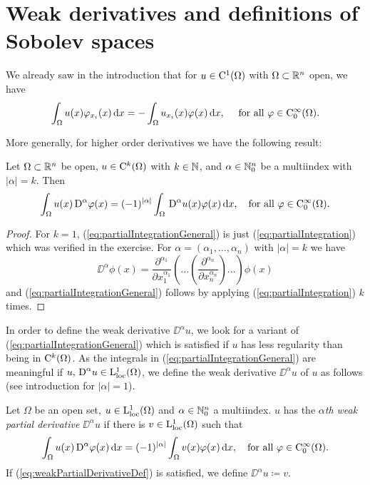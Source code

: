 \chapter{Weak derivatives and definitions of Sobolev spaces}

We already saw in the introduction that for $u \in \mathrm{C}^1(\Omega)$ with $\Omega \subset \mathbb{R}^n$ open, we have 
\begin{equation}
  \label{eq:partialIntegration}
  \int_\Omega u(x) \varphi_{x_i}(x) \, {\operatorname{d}\!{x}} = -\int_\Omega u_{x_i}(x) \varphi(x) \, {\operatorname{d}\!{x}}, \quad \text{ for all } \varphi \in \mathrm{C}_0^\infty(\Omega).
\end{equation}

More generally, for higher order derivatives we have the following result:
\begin{lem}
  \label{lem:partialIntegrationGeneral}
  Let $\Omega \subset \mathbb{R}^n$ be open, $u \in \mathrm{C}^k(\Omega)$ with $k \in \mathbb{N}$, and $\alpha \in \mathbb{N}_0^n$ be a multiindex with $|\alpha| = k$. Then
  \begin{equation}
    \label{eq:partialIntegrationGeneral}
    \int_\Omega u(x) \,{\operatorname{D}}^\alpha \varphi(x) = (-1)^{|\alpha|} \int_\Omega \,{\operatorname{D}}^\alpha u(x) \varphi(x) \, {\operatorname{d}\!{x}}, \quad\text{for all } \varphi \in \mathrm{C}_0^\infty(\Omega).
  \end{equation}
\end{lem}

\begin{proof}
  For $k = 1$, (\ref{eq:partialIntegrationGeneral}) is just (\ref{eq:partialIntegration}) which was verified in the exercise.
  For $\alpha = (\alpha_1,\dots,\alpha_n)$ with $|\alpha| = k$ we have
  $$
  \DD^\alpha \phi(x)= \frac{\partial^{\alpha_1}}{\partial x_1^{\alpha_1}} ( \dots ( \frac{\partial^{\alpha_n}}{\partial x_n^{\alpha_n}} ) \dots )\phi(x)
  $$
  and (\ref{eq:partialIntegrationGeneral}) follows by applying (\ref{eq:partialIntegration}) $k$ times.
\end{proof}

In order to define the weak derivative $\DD^\alpha u$, we look for a variant of (\ref{eq:partialIntegrationGeneral}) which is satisfied if $u$ has less regularity than being in $\mathrm{C}^k(\Omega)$.
As the integrals in (\ref{eq:partialIntegrationGeneral}) are meaningful if $u, \,{\operatorname{D}}^\alpha u \in \mathrm{L}^1_{\operatorname{loc}}(\Omega)$, we define the weak derivative $\DD^\alpha u$ of $u$ as follows (see introduction for $|\alpha| = 1$).

\begin{defn}
  \label{defn:weakPartialDerivative}
  Let $\Omega$ be an open set, $u \in \mathrm{L}^1_{\operatorname{loc}}(\Omega)$ and $\alpha \in \mathbb{N}_0^n$ a multiindex. 
  $u$ has the \emph{$\alpha$th weak partial derivative}  $\DD^\alpha u$ if there is $v \in \mathrm{L}_{\operatorname{loc}}^1(\Omega)$ such that
  \begin{equation}
    \label{eq:weakPartialDerivativeDef}
    \int_\Omega u(x) \,{\operatorname{D}}^\alpha \varphi(x) \, {\operatorname{d}\!{x}} = (-1)^{|\alpha|} \int_\Omega v(x) \varphi(x) \, {\operatorname{d}\!{x}}, \quad \text{for all } \varphi \in \mathrm{C}_0^\infty(\Omega).
  \end{equation}
If (\ref{eq:weakPartialDerivativeDef}) is satisfied, we define $\DD^\alpha u \coloneqq v$.
\end{defn}

